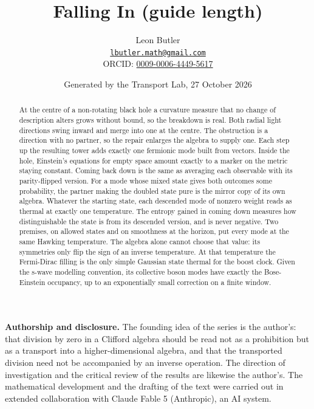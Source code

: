 \documentclass[11pt]{article}
\title{\bfseries Falling In (guide length)}
\author{Leon Butler\\ \normalsize\href{mailto:lbutler.math@gmail.com}{\texttt{lbutler.math@gmail.com}}\\ \normalsize ORCID: \href{https://orcid.org/0009-0006-4449-5617}{0009-0006-4449-5617}}
\date{Generated by the Transport Lab, 27 October 2026}
\theoremstyle{definition}
\theoremstyle{plain}
\begin{document}
\maketitle
\begin{abstract}
\normalsize
At the centre of a non-rotating black hole a curvature measure that no change of description alters grows without bound, so the breakdown is real. Both radial light directions swing inward and merge into one at the centre. The obstruction is a direction with no partner, so the repair enlarges the algebra to supply one. Each step up the resulting tower adds exactly one fermionic mode built from vectors. Inside the hole, Einstein's equations for empty space amount exactly to a marker on the metric staying constant. Coming back down is the same as averaging each observable with its parity-flipped version. For a mode whose mixed state gives both outcomes some probability, the partner making the doubled state pure is the mirror copy of its own algebra. Whatever the starting state, each descended mode of nonzero weight reads as thermal at exactly one temperature. The entropy gained in coming down measures how distinguishable the state is from its descended version, and is never negative. Two premises, on allowed states and on smoothness at the horizon, put every mode at the same Hawking temperature. The algebra alone cannot choose that value: its symmetries only flip the sign of an inverse temperature. At that temperature the Fermi-Dirac filling is the only simple Gaussian state thermal for the boost clock. Given the s-wave modelling convention, its collective boson modes have exactly the Bose-Einstein occupancy, up to an exponentially small correction on a finite window.
\end{abstract}
\newpage
\noindent \textbf{Authorship and disclosure. }The founding idea of the series is the author's: that division by zero in a Clifford algebra should be read not as a prohibition but as a transport into a higher-dimensional algebra, and that the transported division need not be accompanied by an inverse operation. The direction of investigation and the critical review of the results are likewise the author's. The mathematical development and the drafting of the text were carried out in extended collaboration with Claude Fable 5 (Anthropic), an AI system.

\noindent{}
\newpage
\end{document}
